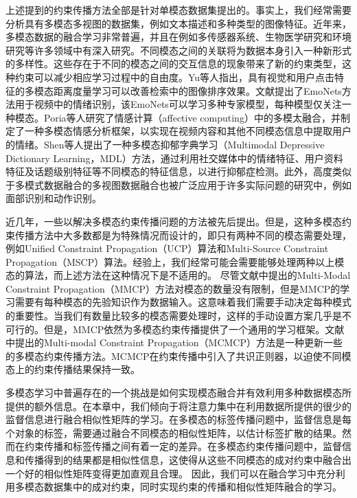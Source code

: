 上述提到的约束传播方法全部是针对单模态数据集提出的。事实上，我们经常需要分析具有多模态多视图的数据集，例如文本描述和多种类型的图像特征。近年来，多模态数据的融合学习非常普遍，并且在例如多传感器系统、生物医学研究和环境研究等许多领域中有深入研究。不同模态之间的关联将为数据本身引入一种新形式的多样性。这些存在于不同的模态之间的交互信息的现象带来了新的约束类型，这种约束可以减少相应学习过程中的自由度\cite{lahat2015multimodal}。Yu等人指出，具有视觉和用户点击特征的多模态距离度量学习可以改善检索中的图像排序效果\cite{yu2017deep}。文献\parencite{kahou2016emonets}提出了EmoNets方法用于视频中的情绪识别，该EmoNets可以学习多种专家模型，每种模型仅关注一种模态。Poria等人研究了情感计算（affective computing）中的多模太融合，并制定了一种多模态情感分析框架，以实现在视频内容和其他不同模态信息中提取用户的情绪\cite{poria2017review,poria2017ensemble}。Shen等人提出了一种多模态抑郁字典学习（Multimodal Depressive Dictionary Learning，MDL）\cite{shen2017depression}方法，通过利用社交媒体中的情绪特征、用户资料特征及话题级别特征等不同模态的特征信息，以进行抑郁症检测。此外，高度类似于多模式数据融合的多视图数据融合也被广泛应用于许多实际问题的研究中，例如面部识别\cite{kan2016multi}和动作识别\cite{shao2016kernelized}。

近几年，一些以解决多模态约束传播问题的方法被先后提出\cite{fu2011multi,fu2012modalities,lu2013unified,lu2013exhaustive}。但是，这种多模态约束传播方法中大多数都是为特殊情况而设计的，即只有两种不同的模态需要处理，例如Unified Constraint Propagation（UCP）\cite{lu2013unified}算法和Multi-Source Constraint Propagation（MSCP）\cite{lu2013exhaustive}算法。经验上，我们经常可能会需要能够处理两种以上模态的算法，而上述方法在这种情况下是不适用的。
尽管文献\parencite{fu2011multi}中提出的Multi-Modal Constraint Propagation（MMCP）方法对模态的数量没有限制，但是MMCP的学习需要有每种模态的先验知识作为数据输入。这意味着我们需要手动决定每种模式的重要性。当我们有数量比较多的模态需要处理时，这样的手动设置方案几乎是不可行的。但是，MMCP依然为多模态约束传播提供了一个通用的学习框架。文献\parencite{fu2012modalities}中提出的Multi-modal Constraint Propagation（MCMCP）方法是一种更新一些的多模态约束传播方法。MCMCP在约束传播中引入了共识正则器，以迫使不同模态上的约束传播结果保持一致。

多模态学习中普遍存在的一个挑战是如何实现模态融合并有效利用多种数据模态所提供的额外信息。在本章中，我们倾向于将注意力集中在利用数据所提供的很少的监督信息进行融合相似性矩阵的学习。在多模态的标签传播问题中，监督信息是每个对象的标签，需要通过融合不同模态的相似性矩阵，以估计标签扩散的结果。然而在约束传播和标签传播之间有着一定的差异。在多模态约束传播问题中，监督信息和传播得到的结果都是相似性信息，这使得从这些不同模态的成对约束中融合出一个好的相似性矩阵变得更加直观且合理。 因此，我们可以在融合学习中充分利用多模态数据集中的成对约束，同时实现约束的传播和相似性矩阵融合的学习。

